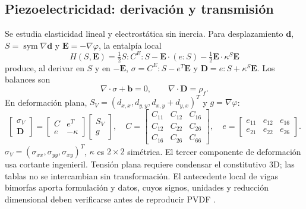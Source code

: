 \subsection{Piezoelectricidad: derivación y transmisión}
Se estudia elasticidad lineal y electrostática sin inercia. Para desplazamiento $\mathbf d$, $S=\operatorname{sym}\nabla\mathbf d$ y $\mathbf E=-\nabla\varphi$, la entalpía local
\begin{equation}H(S,\mathbf E)=\tfrac12S:C^E:S-\mathbf E\cdot(e:S)-\tfrac12\mathbf E\cdot\kappa^S\mathbf E\end{equation}
produce, al derivar en $S$ y en $-\mathbf E$, $\sigma=C^E:S-e^T\mathbf E$ y $\mathbf D=e:S+\kappa^S\mathbf E$. Los balances son
\begin{equation}\nabla\cdot\sigma+\mathbf b=0,\qquad\nabla\cdot\mathbf D=\rho_f.\label{eq:piezo}\end{equation}
En deformación plana, $S_V=(d_{x,x},d_{y,y},d_{x,y}+d_{y,x})^T$ y $g=\nabla\varphi$:
\begin{equation}
\begin{bmatrix}\sigma_V\\\mathbf D\end{bmatrix}=\begin{bmatrix}C&e^T\\e&-\kappa\end{bmatrix}\begin{bmatrix}S_V\\g\end{bmatrix},\quad
C=\begin{bmatrix}C_{11}&C_{12}&C_{16}\\C_{12}&C_{22}&C_{26}\\C_{16}&C_{26}&C_{66}\end{bmatrix},\quad
e=\begin{bmatrix}e_{11}&e_{12}&e_{16}\\e_{21}&e_{22}&e_{26}\end{bmatrix}.
\end{equation}
$\sigma_V=(\sigma_{xx},\sigma_{yy},\sigma_{xy})^T$, $\kappa$ es $2\times2$ simétrica. El tercer componente de deformación usa cortante ingenieril. Tensión plana requiere condensar el constitutivo 3D; las tablas no se intercambian sin transformación. El antecedente local de vigas bimorfas aporta formulación y datos, cuyos signos, unidades y reducción dimensional deben verificarse antes de reproducir PVDF \cite{gonzalez2026pinnpiezo,lahmer2008}.

